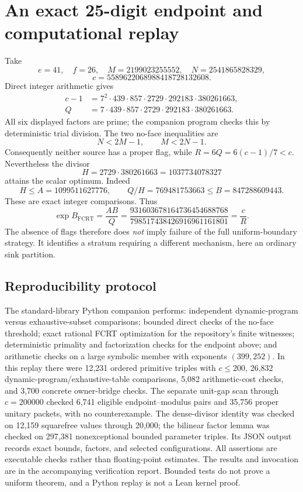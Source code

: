 \documentclass[11pt]{article}
\theoremstyle{definition}\newtheorem{definition}[theorem]{Definition}
\theoremstyle{remark}\newtheorem{remark}[theorem]{Remark}
\newcommand{\FCRT}{\mathrm{FCRT}}
\begin{document}
\section{An exact 25-digit endpoint and computational replay}
Take
\[
 e=41,\quad f=26,\quad
 M=2199023255552,\quad N=2541865828329,
\]
\[
 c=5589622068988418728132608.
\]
Direct integer arithmetic gives
\begin{align*}
 c-1&=7^2\cdot439\cdot857\cdot2729\cdot292183\cdot380261663,\\
 Q&=7\cdot439\cdot857\cdot2729\cdot292183\cdot380261663.
\end{align*}
All six displayed factors are prime; the companion program checks this by
deterministic trial division. The two no-face inequalities are
\[
 N<2M-1,\qquad M<2N-1.
\]
Consequently neither source has a proper flag, while \(R=6Q=6(c-1)/7<c\).
Nevertheless the divisor
\[
 H=2729\cdot380261663=1037734078327
\]
attains the scalar optimum. Indeed
\[
 H\le A=1099511627776,\qquad
 Q/H=769481753663\le B=847288609443.
\]
These are exact integer comparisons. Thus
\[
 \exp B_{\FCRT}=\frac{AB}{Q}
  =\frac{931603678164736454688768}{798517438426916961161801}
  =\frac{c}{R}.
\]
The absence of flags therefore does \emph{not} imply failure of the full
uniform-boundary strategy. It identifies a stratum requiring a different
mechanism, here an ordinary sink partition.

\subsection{Reproducibility protocol}
The standard-library Python companion performs: independent dynamic-program
versus exhaustive-subset comparisons; bounded direct checks of the no-face
threshold; exact rational FCRT optimization for the repository's finite
witnesses; deterministic primality and factorization checks for the endpoint
above; and arithmetic checks on a large symbolic member with exponents
\((399,252)\). In this replay there were 12,231 ordered primitive triples with \(c\le200\),
26,832 dynamic-program/exhaustive-table comparisons, 5,082 arithmetic-cost
checks, and 3,700 concrete owner-bridge checks. The separate unit-gap scan
through \(c=200000\) checked 6,741 eligible endpoint--modulus pairs and
35,756 proper unitary packets, with no counterexample. The dense-divisor
identity was checked on 12,159 squarefree values through 20,000; the bilinear
factor lemma was checked on 297,381 nonexceptional bounded parameter triples.
Its JSON output records exact bounds, factors, and selected configurations. All assertions are executable checks rather than
floating-point estimates. The results and invocation are in the accompanying
verification report. Bounded tests do not prove a uniform theorem, and a
Python replay is not a Lean kernel proof.
\end{document}
